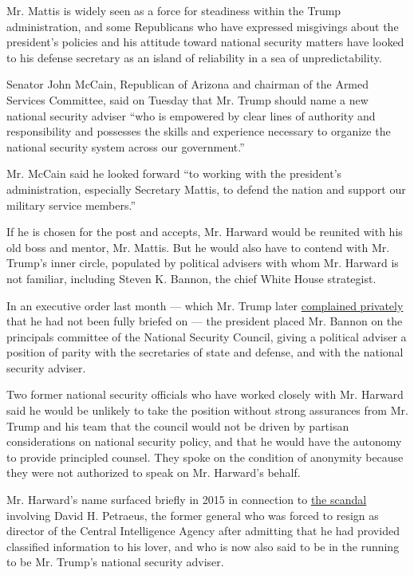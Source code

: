 Mr. Mattis is widely seen as a force for steadiness within the Trump
administration, and some Republicans who have expressed misgivings about
the president's policies and his attitude toward national security
matters have looked to his defense secretary as an island of reliability
in a sea of unpredictability.

Senator John McCain, Republican of Arizona and chairman of the Armed
Services Committee, said on Tuesday that Mr. Trump should name a new
national security adviser ``who is empowered by clear lines of authority
and responsibility and possesses the skills and experience necessary to
organize the national security system across our government.''

Mr. McCain said he looked forward ``to working with the president's
administration, especially Secretary Mattis, to defend the nation and
support our military service members.''

If he is chosen for the post and accepts, Mr. Harward would be reunited
with his old boss and mentor, Mr. Mattis. But he would also have to
contend with Mr. Trump's inner circle, populated by political advisers
with whom Mr. Harward is not familiar, including Steven K. Bannon, the
chief White House strategist.

In an executive order last month --- which Mr. Trump later
\href{http://www.nytimes.com/2017/02/05/us/politics/trump-white-house-aides-strategy.html}{complained
privately} that he had not been fully briefed on --- the president
placed Mr. Bannon on the principals committee of the National Security
Council, giving a political adviser a position of parity with the
secretaries of state and defense, and with the national security
adviser.

Two former national security officials who have worked closely with Mr.
Harward said he would be unlikely to take the position without strong
assurances from Mr. Trump and his team that the council would not be
driven by partisan considerations on national security policy, and that
he would have the autonomy to provide principled counsel. They spoke on
the condition of anonymity because they were not authorized to speak on
Mr. Harward's behalf.

Mr. Harward's name surfaced briefly in 2015 in connection to
\href{http://www.nytimes.com/2015/04/24/us/david-petraeus-to-be-sentenced-in-leak-investigation.html}{the
scandal} involving David H. Petraeus, the former general who was forced
to resign as director of the Central Intelligence Agency after admitting
that he had provided classified information to his lover, and who is now
also said to be in the running to be Mr. Trump's national security
adviser.

